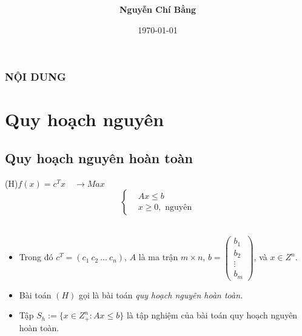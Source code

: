 \documentclass{beamer}
\begin{document}
\title[]{\fontsize{13pt}{10pt}\selectfont {\bf \LARGE Phương pháp nhánh cận}\\}
\author[]{\bf Nguyễn Chí Bằng \\}
\small{\date{\today}}
\begin{frame}
\begin{center}
\end{center}
\titlepage
\end{frame}

\begin{frame}
    \frametitle{NỘI DUNG}
    \tableofcontents
\end{frame}

\section{Quy hoạch nguyên}
\subsection{Quy hoạch nguyên hoàn toàn}
\begin{frame}
    \begin{center}                    
        \big(H\big)\quad $f(x)=c^Tx \quad \longrightarrow Max$ \\
        \[\left\{\begin{aligned}
            &Ax \leq  b \\
            &x\geq 0, \text{ nguyên}
        \end{aligned}\right.\]\\
    \end{center}
    \begin{itemize}
    \item Trong đó $c^T=(c_1 \: c_2 \: \ldots \: c_n)$, $A$ là ma trận $m\times n$, $b=\begin{pmatrix}
        b_1 \\
        b_2 \\
        \vdots \\
        b_m
        \end{pmatrix}$, và $x\in Z^n$.
    \item Bài toán $(H)$ gọi là bài toán \textit{quy hoạch nguyên hoàn toàn.}
    \item Tập $S_h:=\{x\in Z^n_+: Ax\leq b\}$ là tập nghiệm của bài toán quy hoạch nguyên hoàn toàn.
    \end{itemize}
\end{frame}
\end{document}
